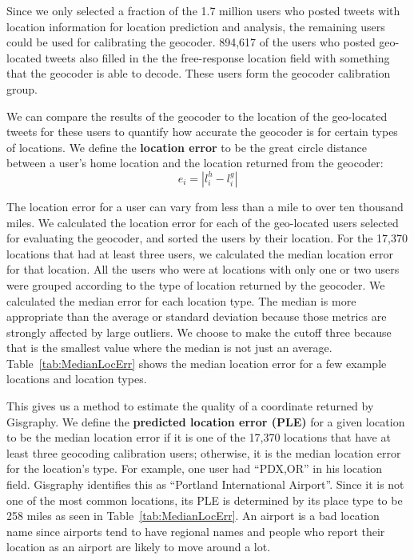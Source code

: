 \documentclass[letterpaper]{article}
\begin{document}
Since we only selected a fraction of the 1.7 million users who posted tweets with
location information for location prediction and analysis, the remaining users
could be used for calibrating the geocoder.
%
894,617 of the users who posted geo-located tweets also filled in the
the free-response location field with something that the geocoder is able to
decode.
%
These users form the geocoder calibration group.

We can compare the results of the geocoder to the location of the geo-located
tweets for these users to quantify how accurate the geocoder is for certain
types of locations.
%
We define the \textbf{location error} to be the great circle distance between a
user's home location and the location returned from the geocoder:
\[
e_i = |l^h_i - l^g_i|
\]

The location error for a user can vary from less than a mile to over ten
thousand miles.
%
We calculated the location error for each of the geo-located users selected for
evaluating the geocoder, and sorted the users by their location.
%
For the 17,370 locations that had at least three users, we calculated the median
location error for that location.
%
All the users who were at locations with only one or two users were grouped
according to the type of location returned by the geocoder.
%
We calculated the median error for each location type.
%
The median is more appropriate than the average or standard deviation because
those metrics are strongly affected by large outliers.
%
We choose to make the cutoff three because that is the smallest value where the
median is not just an average.
Table~\ref{tab:MedianLocErr} shows the median location error for a few example
locations and location types.

This gives us a method to estimate the quality of a coordinate returned by
Gisgraphy.
%
We define the \textbf{predicted location error (PLE)} for a given location to
be the median location error if it is one of the 17,370 locations that have
at least three geocoding calibration users; otherwise, it is the median
location error for the location's type.
%
For example, one user had ``PDX,OR'' in his location field.
%
Gisgraphy identifies this as ``Portland International Airport''.
%
Since it is not one of the most common locations, its PLE is determined by its
place type to be 258 miles as seen in Table~\ref{tab:MedianLocErr}.
%
An airport is a bad location name since airports tend to have regional names
and people who report their location as an airport are likely to move around a
lot.
\end{document}
